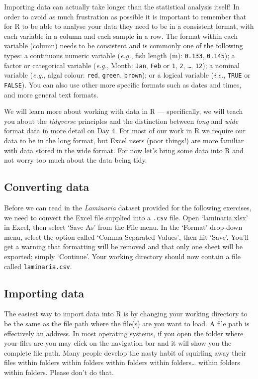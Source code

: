 \documentclass[]{book}
\theoremstyle{definition}
\theoremstyle{definition}
\theoremstyle{definition}
\theoremstyle{remark}
\begin{document}
Importing data can actually take longer than the statistical analysis
itself! In order to avoid as much frustration as possible it is
important to remember that for R to be able to analyse your data they
need to be in a consistent format, with each variable in a column and
each sample in a row. The format within each variable (column) needs to
be consistent and is commonly one of the following types: a continuous
numeric variable (\emph{e.g.}, fish length (m): \texttt{0.133},
\texttt{0.145}); a factor or categorical variable (\emph{e.g.}, Month:
\texttt{Jan}, \texttt{Feb} or \texttt{1}, \texttt{2}, \texttt{\ldots{}},
\texttt{12}); a nominal variable (\emph{e.g.}, algal colour:
\texttt{red}, \texttt{green}, \texttt{brown}); or a logical variable
(\emph{i.e.}, \texttt{TRUE} or \texttt{FALSE}). You can also use other
more specific formats such as dates and times, and more general text
formats.

We will learn more about working with data in R --- specifically, we
will teach you about the \emph{tidyverse} principles and the distinction
between \emph{long} and \emph{wide} format data in more detail on Day 4.
For most of our work in R we require our data to be in the long format,
but Excel users (poor things!) are more familiar with data stored in the
wide format. For now let's bring some data into R and not worry too much
about the data being tidy.

\subsection{Converting data}\label{converting-data}

Before we can read in the \emph{Laminaria} dataset provided for the
following exercises, we need to convert the Excel file supplied into a
\texttt{.csv} file. Open `laminaria.xlsx' in Excel, then select `Save
As' from the File menu. In the `Format' drop-down menu, select the
option called `Comma Separated Values', then hit `Save'. You'll get a
warning that formatting will be removed and that only one sheet will be
exported; simply `Continue'. Your working directory should now contain a
file called \texttt{laminaria.csv}.

\subsection{Importing data}\label{importing-data}

The easiest way to import data into R is by changing your working
directory to be the same as the file path where the file(s) are you want
to load. A file path is effectively an address. In most operating
systems, if you open the folder where your files are you may click on
the navigation bar and it will show you the complete file path. Many
people develop the nasty habit of squirling away their files within
folders within folders within folders within folders\ldots{} within
folders within folders. Please don't do that.
\end{document}
